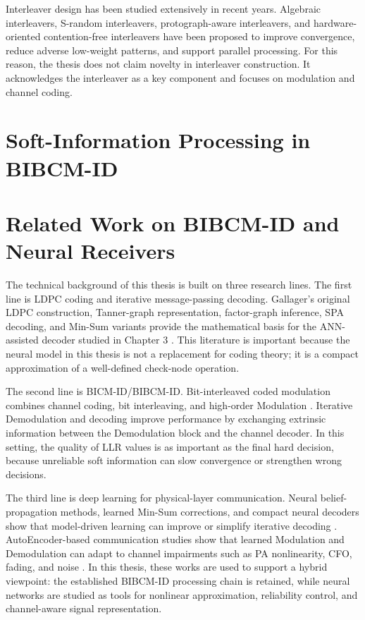 Interleaver design has been studied extensively in recent years. Algebraic interleavers, S-random interleavers, protograph-aware interleavers, and hardware-oriented contention-free interleavers have been proposed to improve convergence, reduce adverse low-weight patterns, and support parallel processing. For this reason, the thesis does not claim novelty in interleaver construction. It acknowledges the interleaver as a key component and focuses on modulation and channel coding.

\section{Soft-Information Processing in BIBCM-ID}




\section{Related Work on BIBCM-ID and Neural Receivers}
The technical background of this thesis is built on three research lines. The first line is LDPC coding and iterative message-passing decoding. Gallager's original LDPC construction, Tanner-graph representation, factor-graph inference, SPA decoding, and Min-Sum variants provide the mathematical basis for the ANN-assisted decoder studied in Chapter 3 \cite{gallager1962,tanner1981,kschischang2001,hu2001spa,chen2002}. This literature is important because the neural model in this thesis is not a replacement for coding theory; it is a compact approximation of a well-defined check-node operation.

The second line is BICM-ID/BIBCM-ID. Bit-interleaved coded modulation combines channel coding, bit interleaving, and high-order Modulation \cite{zehavi1992,caire1998,li1997,li1998}. Iterative Demodulation and decoding improve performance by exchanging extrinsic information between the Demodulation block and the channel decoder. In this setting, the quality of LLR values is as important as the final hard decision, because unreliable soft information can slow convergence or strengthen wrong decisions.

The third line is deep learning for physical-layer communication. Neural belief-propagation methods, learned Min-Sum corrections, and compact neural decoders show that model-driven learning can improve or simplify iterative decoding \cite{nachmani2016,nachmani2018,lugosch2017,kuck2020,wang2022}. AutoEncoder-based communication studies show that learned Modulation and Demodulation can adapt to channel impairments such as PA nonlinearity, CFO, fading, and noise \cite{oshea2017,dorner2018,aoudia2019,rapp1991,saleh1981}. In this thesis, these works are used to support a hybrid viewpoint: the established BIBCM-ID processing chain is retained, while neural networks are studied as tools for nonlinear approximation, reliability control, and channel-aware signal representation.

